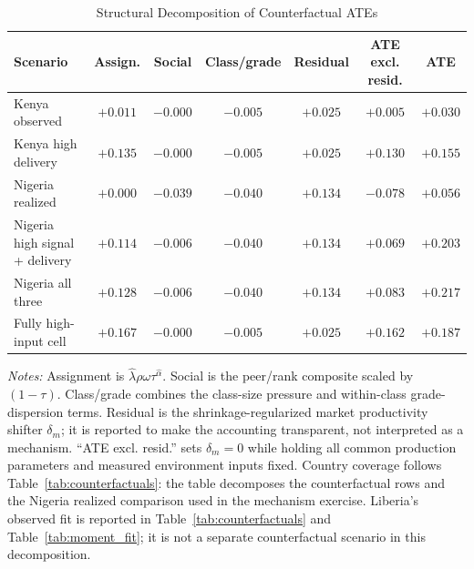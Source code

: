 \begin{table}[H]
\centering
\caption{Structural Decomposition of Counterfactual ATEs}
\label{tab:struct_component_decomp}
\begin{threeparttable}
\scriptsize
\setlength{\tabcolsep}{3pt}
\begin{tabular}[t]{lcccccc}
\toprule
Scenario & Assign. & Social & Class/grade & Residual & ATE excl. resid. & ATE \\
\midrule
Kenya observed & $+0.011$ & $-0.000$ & $-0.005$ & $+0.025$ & $+0.005$ & $+0.030$ \\
Kenya high delivery & $+0.135$ & $-0.000$ & $-0.005$ & $+0.025$ & $+0.130$ & $+0.155$ \\
Nigeria realized & $+0.000$ & $-0.039$ & $-0.040$ & $+0.134$ & $-0.078$ & $+0.056$ \\
Nigeria high signal + delivery & $+0.114$ & $-0.006$ & $-0.040$ & $+0.134$ & $+0.069$ & $+0.203$ \\
Nigeria all three & $+0.128$ & $-0.006$ & $-0.040$ & $+0.134$ & $+0.083$ & $+0.217$ \\
Fully high-input cell & $+0.167$ & $-0.000$ & $-0.005$ & $+0.025$ & $+0.162$ & $+0.187$ \\
\bottomrule
\end{tabular}
\begin{tablenotes}
\footnotesize
\item \textit{Notes:} Assignment is $\hat{\lambda}\rho\omega\tau^{\hat{\alpha}}$. Social is the peer/rank composite scaled by $(1-\tau)$. Class/grade combines the class-size pressure and within-class grade-dispersion terms. Residual is the shrinkage-regularized market productivity shifter $\delta_m$; it is reported to make the accounting transparent, not interpreted as a mechanism. ``ATE excl. resid.'' sets $\delta_m=0$ while holding all common production parameters and measured environment inputs fixed. Country coverage follows Table~\ref{tab:counterfactuals}: the table decomposes the counterfactual rows and the Nigeria realized comparison used in the mechanism exercise. Liberia's observed fit is reported in Table~\ref{tab:counterfactuals} and Table~\ref{tab:moment_fit}; it is not a separate counterfactual scenario in this decomposition.
\end{tablenotes}
\end{threeparttable}
\end{table}
